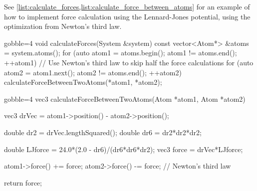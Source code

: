 See \cref{list:calculate_forces,list:calculate_force_between_atoms} for an example of how to implement force calculation using the Lennard-Jones potential, using the optimization from Newton's third law.
%
\begin{listing}[!htb]%
%                 
\begin{cppcode*}{gobble=4}
    void calculateForces(System &system)
    {
        const vector<Atom*> &atoms = system.atoms();
        for (auto atom1 = atoms.begin(); atom1 != atoms.end(); ++atom1)
        {
            // Use Newton's third law to skip half the force calculations
            for (auto atom2 = atom1.next(); atom2 != atoms.end(); ++atom2)
            {
                calculateForceBetweenTwoAtoms(*atom1, *atom2);
            }
        }
    }
\end{cppcode*}%
\caption{%
    Caption.%
    \label{list:calculate_forces}%
}%
\end{listing}%
%
\begin{listing}[!htb]%
\begin{cppcode*}{gobble=4}
    vec3 calculateForceBetweenTwoAtoms(Atom *atom1, Atom *atom2)
    {
        vec3 drVec = atom1->position() - atom2->position();
        
        double dr2 = drVec.lengthSquared();
        double dr6 = dr2*dr2*dr2;

        double LJforce = 24.0*(2.0 - dr6)/(dr6*dr6*dr2);
        vec3 force = drVec*LJforce;
        
        atom1->force() += force;
        atom2->force() -= force; // Newton's third law
        
        return force;
    }
\end{cppcode*}%
\caption{%
    Caption.%
    \label{list:calculate_force_between_atoms}%
}%
\end{listing}%

